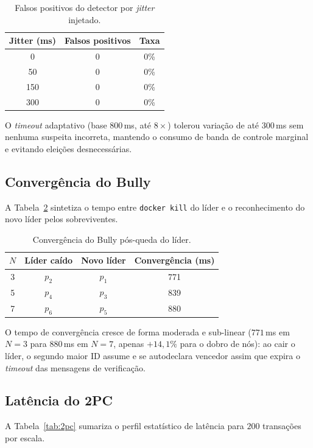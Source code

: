 \documentclass[conference]{IEEEtran}
\begin{document}
\begin{table}[!t]
\caption{Falsos positivos do detector por \textit{jitter} injetado.}
\label{tab:hb}
\centering
\scriptsize
\begin{tabular}{ccc}
\toprule
Jitter (ms) & Falsos positivos & Taxa \\
\midrule
0   & 0 & 0\% \\
50  & 0 & 0\% \\
150 & 0 & 0\% \\
300 & 0 & 0\% \\
\bottomrule
\end{tabular}
\end{table}

O \textit{timeout} adaptativo (base $800$\,ms, até $8\times$) tolerou variação de até $300$\,ms sem nenhuma suspeita incorreta, mantendo o consumo de banda de controle marginal e evitando eleições desnecessárias.

\subsection{Convergência do Bully}
A Tabela~\ref{tab:bully} sintetiza o tempo entre \texttt{docker kill} do líder e o reconhecimento do novo líder pelos sobreviventes.

\begin{table}[!t]
\caption{Convergência do Bully pós-queda do líder.}
\label{tab:bully}
\centering
\scriptsize
\begin{tabular}{cccc}
\toprule
$N$ & Líder caído & Novo líder & Convergência (ms) \\
\midrule
3 & $p_2$ & $p_1$ & 771 \\
5 & $p_4$ & $p_3$ & 839 \\
7 & $p_6$ & $p_5$ & 880 \\
\bottomrule
\end{tabular}
\end{table}

O tempo de convergência cresce de forma moderada e sub-linear ($771$\,ms em $N=3$ para $880$\,ms em $N=7$, apenas $+14{,}1\%$ para o dobro de nós): ao cair o líder, o segundo maior ID assume e se autodeclara vencedor assim que expira o \textit{timeout} das mensagens de verificação.

\subsection{Latência do 2PC}
A Tabela~\ref{tab:2pc} sumariza o perfil estatístico de latência para $200$ transações por escala.
\end{document}
